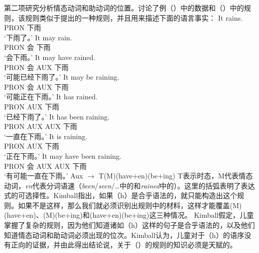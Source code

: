 第二项研究分析情态动词和助动词的位置。\citet[--75]{Kimball73b-u}讨论了例（）中的数据和（）中的规则，该规则类似于\citet[]{Chomsky57a}提出的一种规则，并且用来描述下面的语言事实：
\eal
\label{Aux-Beispiele}
\ex 
\gll It rains.\\
PRON 下雨\\
\glt `下雨了。'
\ex\label{It-may-rain} 
\gll It may rain.\\
PRON 会 下雨\\
\glt `会下雨。'
\ex 
\gll It may have rained.\\
PRON 会 AUX 下雨\\
\glt `可能已经下雨了。'
\ex 
\gll It may be raining.\\
PRON 会 AUX 下雨\\
\glt `可能正在下雨。'
\ex 
\gll It has rained.\\
PRON AUX 下雨\\
\glt `已经下雨了。'
\ex 
\gll It has been raining.\\
PRON AUX AUX 下雨\\
\glt `一直在下雨。'
\ex 
\gll It is raining.\\
PRON AUX 下雨\\
\glt `正在下雨。'
\ex\label{It-may-have-been-raining} 
\gll It may have been raining.\\
PRON 会 AUX AUX 下雨\\
\glt `有可能一直在下雨。'
\zl
\ea
\label{Regel-Aux}
Aux $\to$ T(M)(have+en)(be+ing)
\z
T表示时态，M代表情态动词，\emph{en}代表分词语速（\emph{been}/\emph{seen}/\ldots{}中的和\emph{rained}中的）。这里的括弧表明了表达式的可选择性。Kimball指出，如果（h）是合乎语法的，就只能构造出这个规则。如果不是这样，那么我们就必须识别出规则中的材料，这样才能覆盖(M)(have+en)、(M)(be+ing)和(have+en)(be+ing)这三种情况。
Kimball假定，儿童掌握了复杂的规则，因为他们知道诸如（h）这样的句子是合乎语法的，以及他们知道情态动词和助动词必须出现的位次。Kimball认为，儿童对于（h）的语序没有正向的证据，并由此得出结论说，关于（）的规则的知识必须是天赋的。
